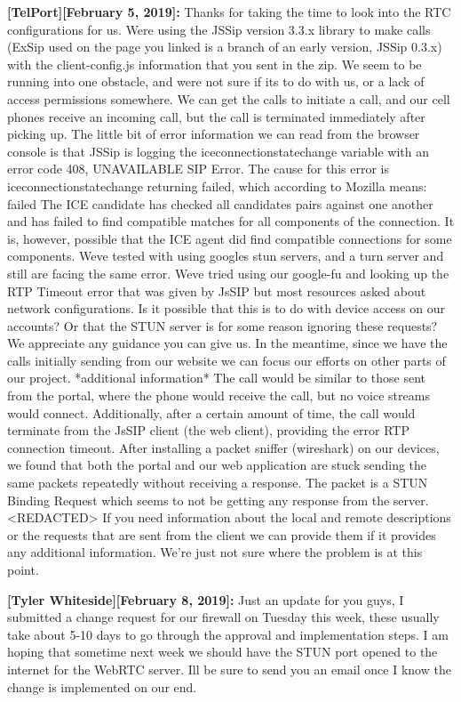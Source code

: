 \documentclass[12pt]{article}
\begin{document}
\textbf{[TelPort][February 5, 2019]:} Thanks for taking the time to look into the RTC configurations for us. Were using the JSSip version 3.3.x library to make calls (ExSip used on the page you linked is a branch of an early version, JSSip 0.3.x) with the client-config.js information that you sent in the zip. We seem to be running into one obstacle, and were not sure if its to do with us, or a lack of access permissions somewhere. We can get the calls to initiate a call, and our cell phones receive an incoming call, but the call is terminated immediately after picking up. The little bit of error information we can read from the browser console is that JSSip is logging the iceconnectionstatechange variable with an error code 408, UNAVAILABLE SIP Error. The cause for this error is iceconnectionstatechange returning failed, which according to Mozilla means: failed The ICE candidate has checked all candidates pairs against one another and has failed to find compatible matches for all components of the connection. It is, however, possible that the ICE agent did find compatible connections for some components. Weve tested with using googles stun servers, and a turn server and still are facing the same error. Weve tried using our google-fu and looking up the RTP Timeout error that was given by JsSIP but most resources asked about network configurations. Is it possible that this is to do with device access on our accounts? Or that the STUN server is for some reason ignoring these requests? We appreciate any guidance you can give us. In the meantime, since we have the calls initially sending from our website we can focus our efforts on other parts of our project. *additional information* The call would be similar to those sent from the portal, where the phone would receive the call, but no voice streams would connect. Additionally, after a certain amount of time, the call would terminate from the JsSIP client (the web client), providing the error RTP connection timeout. After installing a packet sniffer (wireshark) on our devices, we found that both the portal and our web application are stuck sending the same packets repeatedly without receiving a response. The packet is a STUN Binding Request which seems to not be getting any response from the server. <REDACTED> If you need information about the local and remote descriptions or the requests that are sent from the client we can provide them if it provides any additional information. We're just not sure where the problem is at this point.

\textbf{[Tyler Whiteside][February 8, 2019]:} Just an update for you guys,   I submitted a change request for our firewall on Tuesday this week, these usually take about 5-10 days to go through the approval and implementation steps.  I am hoping that sometime next week we should have the STUN port opened to the internet for the WebRTC server. Ill be sure to send you an email once I know the change is implemented on our end.
\end{document}
